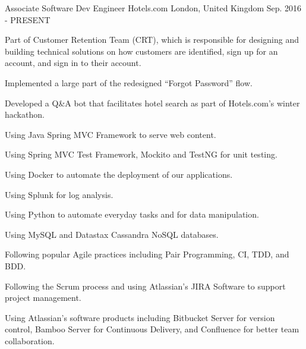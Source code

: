 

\begin{cventries}

  \cventry
    {Associate Software Dev Engineer} %
    {Hotels.com} %
    {London, United Kingdom} %
    {Sep. 2016 - PRESENT} %
    {
      \begin{cvitems} %
        \item {Part of Customer Retention Team (CRT), which is responsible for designing and building technical solutions on how customers are identified, sign up for an account, and sign in to their account.}
        \item {Implemented a large part of the redesigned ``Forgot Password'' flow.}
        \item {Developed a Q\&A bot that facilitates hotel search as part of Hotels.com's winter hackathon.}
        \item {Using Java Spring MVC Framework to serve web content.}
        \item {Using Spring MVC Test Framework, Mockito and TestNG for unit testing.}
        \item {Using Docker to automate the deployment of our applications.}
        \item {Using Splunk for log analysis.}
        \item {Using Python to automate everyday tasks and for data manipulation.}
       \item {Using MySQL and Datastax Cassandra NoSQL databases.}
        \item {Following popular Agile practices including Pair Programming, CI, TDD, and BDD.}
        \item {Following the Scrum process and using Atlassian's JIRA Software to support project management.}
        \item {Using Atlassian's software products including Bitbucket Server for version control, Bamboo Server for Continuous Delivery, and Confluence for better team collaboration.}
      \end{cvitems}
    }

\end{cventries}
